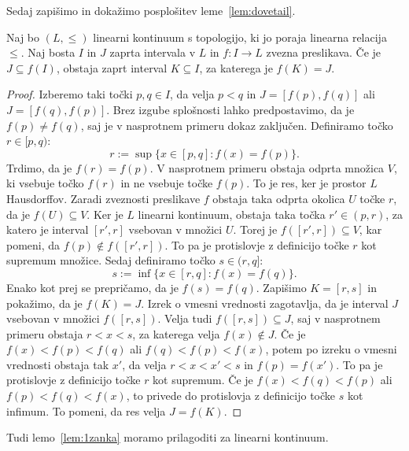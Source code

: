 \documentclass[../TG_magistrsko_delo_sections.tex]{subfiles}
\begin{document}
Sedaj zapišimo in dokažimo posplošitev leme~\ref{lem:dovetail}.

\begin{lema}\label{lem:K}
Naj bo $(L, \leq)$ linearni kontinuum s topologijo, ki jo poraja linearna relacija $\leq$. Naj bosta $I$ in $J$ zaprta intervala v $L$ in $f \colon I \to L$ zvezna preslikava. Če je $J \subseteq f(I)$, obstaja zaprt interval $K \subseteq I$, za katerega je $f(K) = J$.
\end{lema}
\begin{proof}
Izberemo taki točki $p, q \in I$, da velja $p<q$ in $J=[f(p), f(q)]$ ali $J=[f(q), f(p)]$. Brez izgube splošnosti lahko predpostavimo, da je $f(p) \neq f(q)$, saj je v nasprotnem primeru dokaz zaključen. Definiramo točko $r \in [p, q)$:
$$r := \sup\{x \in [p, q] : f(x) = f(p)\}.$$
Trdimo, da je $f(r) = f(p)$. V nasprotnem primeru obstaja odprta množica $V$, ki vsebuje točko $f(r)$ in ne vsebuje točke $f(p)$. To je res, ker je prostor $L$ Hausdorffov. Zaradi zveznosti preslikave $f$ obstaja taka odprta okolica $U$ točke $r$, da je $f(U) \subseteq V$. Ker je $L$ linearni kontinuum, obstaja taka točka $ r' \in(p, r)$, za katero je interval $[r', r]$ vsebovan v množici $U$. Torej je $f([r', r]) \subseteq V$, kar pomeni, da $f(p) \notin f([r', r])$. To pa je protislovje z definicijo točke $r$ kot supremum množice.
Sedaj definiramo točko $s \in (r, q]$:
$$s:= \inf\{x \in [r, q] : f(x) = f(q)\}.$$ 
Enako kot prej se prepričamo, da je $f(s) = f(q)$. Zapišimo $K = [r, s]$ in pokažimo, da je $f(K) = J$. Izrek o vmesni vrednosti zagotavlja, da je interval $J$ vsebovan v množici $f([r, s])$. Velja tudi $f([r, s]) \subseteq J$, saj v nasprotnem primeru obstaja $r<x<s$, za katerega velja $f(x) \notin J$. Če je $f(x) < f(p) < f(q)$ ali $f(q) < f(p) < f(x)$, potem po izreku o vmesni vrednosti obstaja tak $x'$, da velja $r<x<x'<s$ in $f(p) = f(x')$. To pa je protislovje z definicijo točke $r$ kot supremum. Če je $f(x) < f(q) < f(p)$ ali $f(p) < f(q) < f(x)$, to privede do protislovja z definicijo točke $s$ kot infimum. To pomeni, da res velja $J = f(K)$.
\end{proof}

Tudi lemo~\ref{lem:1zanka} moramo prilagoditi za linearni kontinuum.
\end{document}
